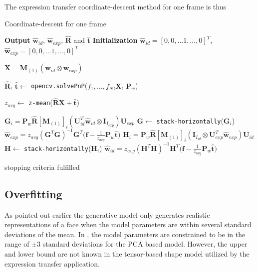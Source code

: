 \documentclass[11pt,a4paper,twoside]{report}
\begin{document}
The expression transfer coordinate-descent method for one frame is thus
\begin{algorithm}\label{a:coorddesc}
\caption{Coordinate-descent for one frame}
\begin{algorithmic}[1]

\State \textbf{Output} $\mathbf{\hat{w}}_{id}$, $\mathbf{\hat{w}}_{exp}$,
$\mathbf{\hat{R}}$ and $\mathbf{\hat{t}}$
\State \textbf{Initialization} $\mathbf{\hat{w}}_{id} = [0,0, \ldots 1, \ldots
  ,0]^T$, $\mathbf{\hat{w}}_{exp} = [0,0, \ldots 1, \ldots ,0]^T$
\Repeat

\State $\mathbf{X} = \mathbf{M}_{(1)}(\mathbf{w}_{id} \otimes \mathbf{w}_{exp})$ 

\State $\mathbf{\hat{R}}$, $\mathbf{\hat{t}} \gets $
\texttt{opencv.solvePnP}($f_1, \ldots ,f_N$,$\mathbf{X}$, $\mathbf{P}_w$)

\State

\State $z_{avg} \gets$ \texttt{z-mean}($\mathbf{\hat{R}}\mathbf{X} + \mathbf{\hat{t}}$)

\State

\State $\mathbf{G}_i = \mathbf{P}_w\mathbf{\hat{R}}[\mathbf{M}_{(1)}]_{i}(\mathbf{U}_{id}^T\mathbf{\hat{w}}_{id}
\otimes \mathbf{I}_{I_{exp}})\mathbf{U}_{exp}$
\State $\mathbf{G} \gets $ \texttt{stack-horizontally}($\mathbf{G}_i$)
\State
\State $\mathbf{\hat{w}}_{exp} = z_{avg}(\mathbf{G}^T\mathbf{G})^{-1}\mathbf{G}^T\bigl(\mathbf{f} - \frac{1}{z_{avg}}\mathbf{P}_w\mathbf{\hat{t}}\bigr)$
\State
\State $\mathbf{H}_i = \mathbf{P}_w\mathbf{\hat{R}}[\mathbf{M}_{(1)}]_{i}(\mathbf{I}_{I_{id}}
\otimes \mathbf{U}_{exp}^T\mathbf{\hat{w}}_{exp})\mathbf{U}_{id}$
\State $\mathbf{H} \gets $ \texttt{stack-horizontally}($\mathbf{H}_i$)
\State
\State $\mathbf{\hat{w}}_{id} = z_{avg}(\mathbf{H}^T\mathbf{H})^{-1}\mathbf{H}^T\bigl(\mathbf{f} - \frac{1}{z_{avg}}\mathbf{P}_w\mathbf{\hat{t}}\bigr)$

\Until stopping criteria fulfilled

\EndProcedure
\end{algorithmic}
\end{algorithm}

\subsection{Overfitting}\label{s:overfitting}
As pointed out earlier the generative model only generates realistic
representations of a face when the model parameters are within several standard
deviations of the mean. In \cite{blanz1}, \cite{jacey} the model parameters are constrained to
be in the range of $\pm$3 standard deviations for the PCA based model. However, the upper and
lower bound are not known in the tensor-based shape model utilized by the
expression transfer application. 
\end{document}
